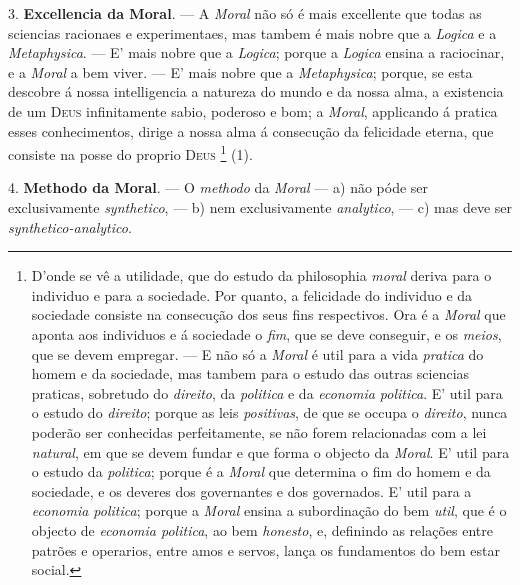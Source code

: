  3. \textbf{Excellencia da Moral}. --- A \emph{Moral} não só é mais excellente que todas as sciencias racionaes e experimentaes, mas tambem é mais nobre que a \emph{Logica} e a \emph{Metaphysica}. --- E' mais nobre que a \emph{Logica}; porque a \emph{Logica} ensina a raciocinar, e a \emph{Moral} a bem viver. --- E' mais nobre que a \emph{Metaphysica}; porque, se esta descobre á nossa intelligencia a natureza do mundo e da nossa alma, a existencia de um \textsc{Deus} infinitamente sabio, poderoso e bom; a \emph{Moral}, applicando á pratica esses conhecimentos, dirige a nossa alma á consecução da felicidade eterna, que consiste na posse do proprio \textsc{Deus} \footnote{D'onde se vê a utilidade, que do estudo da philosophia \emph{moral} deriva para o individuo e para a sociedade. Por quanto, a felicidade do individuo e da sociedade consiste na consecução dos seus fins respectivos. Ora é a \emph{Moral} que aponta aos individuos e á sociedade o \emph{fim}, que se deve conseguir, e os \emph{meios}, que se devem empregar. --- E não só a \emph{Moral} é util para a vida \emph{pratica} do homem e da sociedade, mas tambem para o estudo das outras sciencias praticas, sobretudo do \emph{direito}, da \emph{politica} e da \emph{economia politica}. E' util para o estudo do \emph{direito}; porque as leis \emph{positivas}, de que se occupa o \emph{direito}, nunca poderão ser conhecidas perfeitamente, se não forem relacionadas com a lei \emph{natural}, em que se devem fundar e que forma o objecto da \emph{Moral}. E' util para o estudo da \emph{politica}; porque é a \emph{Moral} que determina o fim do homem e da sociedade, e os deveres dos governantes e dos governados. E' util para a \emph{economia politica}; porque a \emph{Moral} ensina a subordinação do bem \emph{util}, que é o objecto de \emph{economia politica}, ao bem \emph{honesto}, e, definindo as relações entre patrões e operarios, entre amos e servos, lança os fundamentos do bem estar social.} (1).

4. \textbf{Methodo da Moral}. --- O \emph{methodo} da \emph{Moral} --- a) não póde ser exclusivamente \emph{synthetico}, --- b) nem exclusivamente \emph{analytico}, --- c) mas deve ser \emph{synthetico-analytico}.


